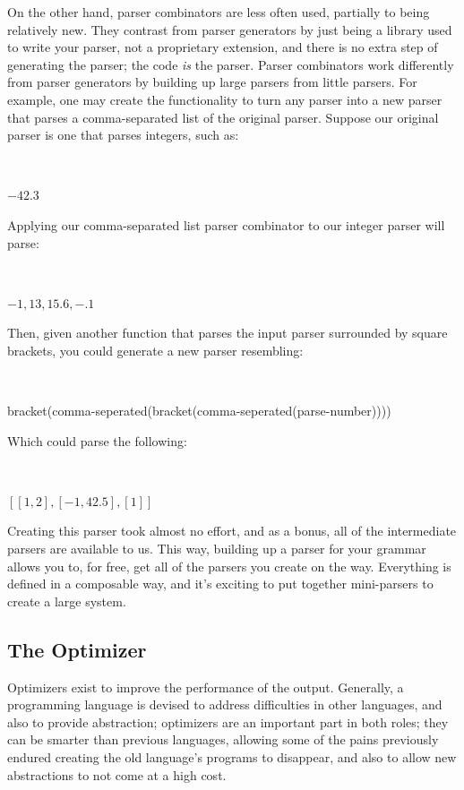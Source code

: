 \documentclass[titlepage]{article}
\begin{document}
			On the other hand, parser combinators are less often used, partially to being relatively new.  They contrast from parser generators by just being a library used to write your parser, not a proprietary extension, and there is no extra step of generating the parser; the code \textit{is} the parser.  Parser combinators work differently from parser generators by building up large parsers from little parsers.  For example, one may create the functionality to turn any parser into a new parser that parses a comma-separated list of the original parser.  Suppose our original parser is one that parses integers, such as:
			\newline

			~\centerline{$-42.3$}
			\newline

			Applying our comma-separated list parser combinator to our integer parser will parse:
			\newline

			~\centerline{$-1, 13, 15.6, -.1$}
			\newline

			Then, given another function that parses the input parser surrounded by square brackets, you could generate a new parser resembling:
			\newline

			~\centerline{bracket(comma-seperated(bracket(comma-seperated(parse-number))))}
			\newline

			Which could parse the following:
			\newline

			~\centerline{$[[1, 2], [-1, 42.5], [1]]$}
			\newline

			Creating this parser took almost no effort, and as a bonus, all of the intermediate parsers are available to us.  This way, building up a parser for your grammar allows you to, for free, get all of the parsers you create on the way.  Everything is defined in a composable way, and it's exciting to put together mini-parsers to create a large system.

		\subsection{The Optimizer}

			Optimizers exist to improve the performance of the output.  Generally, a programming language is devised to address difficulties in other languages, and also to provide abstraction; optimizers are an important part in both roles; they can be smarter than previous languages, allowing some of the pains previously endured creating the old language's programs to disappear, and also to allow new abstractions to not come at a high cost.
\end{document}
